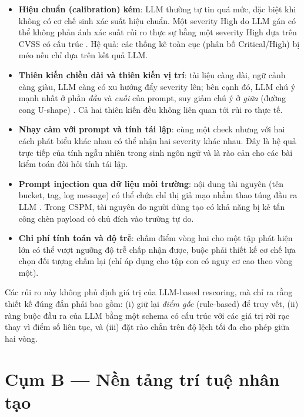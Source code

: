 \begin{itemize}
  \item \textbf{Hiệu chuẩn (calibration) kém}: LLM thường tự tin quá mức, đặc biệt khi không có cơ chế sinh xác suất hiệu chuẩn. Một severity High do LLM gán có thể không phản ánh xác suất rủi ro thực sự bằng một severity High dựa trên CVSS có cấu trúc \cite{guo_calibration_2017}. Hệ quả: các thống kê toàn cục (phân bố Critical/High) bị méo nếu chỉ dựa trên kết quả LLM.
  \item \textbf{Thiên kiến chiều dài và thiên kiến vị trí}: tài liệu càng dài, ngữ cảnh càng giàu, LLM càng có xu hướng đẩy severity lên; bên cạnh đó, LLM chú ý mạnh nhất ở phần \textit{đầu} và \textit{cuối} của prompt, suy giảm chú ý ở \textit{giữa} (đường cong U-shape) \cite{liu_lost_middle_2023}. Cả hai thiên kiến đều không liên quan tới rủi ro thực tế.
  \item \textbf{Nhạy cảm với prompt và tính tái lập}: cùng một check nhưng với hai cách phát biểu khác nhau có thể nhận hai severity khác nhau. Đây là hệ quả trực tiếp của tính ngẫu nhiên trong sinh ngôn ngữ và là rào cản cho các bài kiểm toán đòi hỏi tính tái lập.
  \item \textbf{Prompt injection qua dữ liệu môi trường}: nội dung tài nguyên (tên bucket, tag, log message) có thể chứa chỉ thị giả mạo nhằm thao túng đầu ra LLM \cite{greshake_prompt_injection_2023}. Trong CSPM, tài nguyên do người dùng tạo có khả năng bị kẻ tấn công chèn payload có chủ đích vào trường tự do.
  \item \textbf{Chi phí tính toán và độ trễ}: chấm điểm vòng hai cho một tập phát hiện lớn có thể vượt ngưỡng độ trễ chấp nhận được, buộc phải thiết kế cơ chế lựa chọn đối tượng chấm lại (chỉ áp dụng cho tập con có nguy cơ cao theo vòng một).
\end{itemize}

Các rủi ro này không phủ định giá trị của LLM-based rescoring, mà chỉ ra rằng thiết kế đúng đắn phải bao gồm: (i) giữ lại \textit{điểm gốc} (rule-based) để truy vết, (ii) ràng buộc đầu ra của LLM bằng một schema có cấu trúc với các giá trị rời rạc thay vì điểm số liên tục, và (iii) đặt rào chắn trên độ lệch tối đa cho phép giữa hai vòng.


\section*{Cụm B --- Nền tảng trí tuệ nhân tạo}

